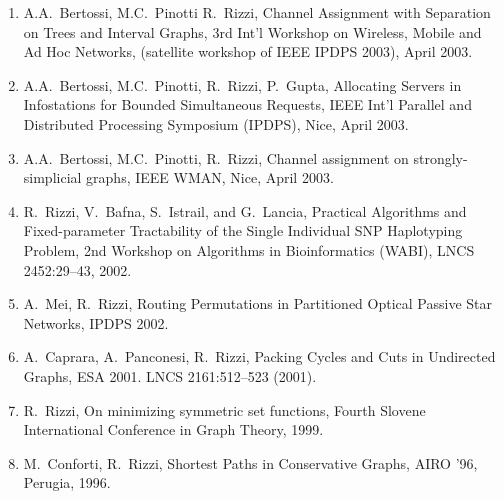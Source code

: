 \documentclass[11pt]{article}
\begin{document}
\begin{enumerate}
\vspace{-1.8mm}
  \item {A.A.~Bertossi, M.C.~Pinotti R.~Rizzi},
   \newblock Channel Assignment with Separation on Trees and Interval Graphs,
   \newblock 3rd Int’l Workshop on Wireless, Mobile and Ad Hoc Networks,
   \newblock (satellite workshop of IEEE IPDPS 2003),
   \newblock April 2003.

\vspace{-1.8mm}
  \item {A.A.~Bertossi, M.C.~Pinotti, R.~Rizzi, P.~Gupta},
   \newblock Allocating Servers in Infostations for Bounded Simultaneous Requests,
   \newblock IEEE Int’l Parallel and Distributed Processing Symposium (IPDPS),
   \newblock Nice, April 2003.

\vspace{-1.8mm}
  \item {A.A.~Bertossi, M.C.~Pinotti, R.~Rizzi},
   \newblock Channel assignment on strongly-simplicial graphs,
   \newblock IEEE WMAN,
   \newblock Nice, April 2003.

\vspace{-1.8mm}
  \item {R.~Rizzi, V.~Bafna, S.~Istrail, and G.~Lancia},
   \newblock Practical Algorithms and Fixed-parameter Tractability
   \newblock of the Single Individual SNP Haplotyping Problem,
   \newblock 2nd Workshop on Algorithms in Bioinformatics (WABI),
   \newblock LNCS 2452:29--43, 2002.

\vspace{-1.8mm}
  \item {A.~Mei, R.~Rizzi},
   \newblock Routing Permutations in Partitioned Optical Passive Star Networks,
   \newblock IPDPS 2002.

\vspace{-1.8mm}
  \item {A.~Caprara, A.~Panconesi, R.~Rizzi},
   \newblock  Packing Cycles and Cuts in Undirected Graphs,
   \newblock ESA 2001.
   \newblock LNCS 2161:512--523 (2001).

\vspace{-1.8mm}
  \item {R.~Rizzi},
   \newblock On minimizing symmetric set functions,
   \newblock Fourth Slovene International Conference
             in Graph Theory, 1999.

\vspace{-1.8mm}
  \item {M.~Conforti, R.~Rizzi},
   \newblock Shortest Paths in Conservative Graphs,
   \newblock AIRO '96, Perugia, 1996.

\end{enumerate}
\end{document}

